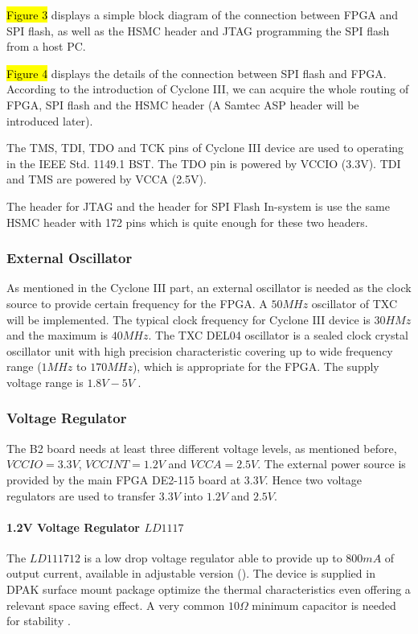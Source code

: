 \hl{Figure 3} displays a simple block diagram of the connection between FPGA and SPI flash, as well as the HSMC header and JTAG programming the SPI flash from a host PC.


\hl{Figure 4} displays the details of the connection between SPI flash and FPGA. According to the introduction of Cyclone III, we can acquire the whole routing of FPGA, SPI flash and the HSMC header (A Samtec ASP header will be introduced later).



The TMS, TDI, TDO and TCK pins of Cyclone III device are used to operating in the IEEE Std. 1149.1 BST. The TDO pin is powered by VCCIO (3.3V). TDI and TMS are powered by VCCA (2.5V).

The header for JTAG and the header for SPI Flash In-system is use the same HSMC header with 172 pins which is quite enough for these two headers.




\subsubsection{External Oscillator}

As mentioned in the Cyclone III part, an external oscillator is needed as the clock source to provide certain frequency for the FPGA. A $50MHz$ oscillator of TXC will be implemented. The typical clock frequency for Cyclone III device is $30HMz$ and the maximum is $40MHz$. The TXC DEL04 oscillator is a sealed clock crystal oscillator unit with high precision characteristic covering up to wide frequency range ($1MHz$ to $170 MHz$), which is appropriate for the FPGA. The supply voltage range is $1.8V-5V$ \citep{TXC:osc_datasheet}.


\subsubsection{Voltage Regulator}

The B2 board needs at least three different voltage levels, as mentioned before, $VCCIO=3.3V$, $VCCINT= 1.2V$ and $VCCA=2.5V$. The external power source is provided by the main FPGA DE2-115 board at $3.3V$. Hence two voltage regulators are used to transfer $3.3V$ into $1.2V$ and $2.5V$.

\paragraph{1.2V Voltage Regulator \texorpdfstring{$LD1117$}{LD1117}}
The $LD111712$ is a low drop voltage regulator able to provide up to $800mA$ of output current, available in adjustable version (). The device is supplied in DPAK surface mount package optimize the thermal characteristics even offering a relevant space saving effect. A very common $10\Omega$ minimum capacitor is needed for stability \citep{STMicro:2012:LD1117xx}.

